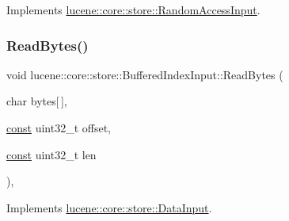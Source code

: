 Implements \mbox{\hyperlink{classlucene_1_1core_1_1store_1_1RandomAccessInput_a3fede3f69a074b11632ad0d07c7bf19f}{lucene\+::core\+::store\+::\+Random\+Access\+Input}}.

\mbox{\label{classlucene_1_1core_1_1store_1_1BufferedIndexInput_ac762d844af38d0b8835f66af3ba46c4c}} 
\subsubsection{\texorpdfstring{Read\+Bytes()}{ReadBytes()}\hspace{0.1cm}{\footnotesize\ttfamily [1/2]}}
{\footnotesize\ttfamily void lucene\+::core\+::store\+::\+Buffered\+Index\+Input\+::\+Read\+Bytes (\begin{DoxyParamCaption}\item[{char}]{bytes\mbox{[}$\,$\mbox{]},  }\item[{\mbox{\hyperlink{ZlibCrc32_8h_a2c212835823e3c54a8ab6d95c652660e}{const}} uint32\+\_\+t}]{offset,  }\item[{\mbox{\hyperlink{ZlibCrc32_8h_a2c212835823e3c54a8ab6d95c652660e}{const}} uint32\+\_\+t}]{len }\end{DoxyParamCaption})\hspace{0.3cm}{\ttfamily [inline]}, {\ttfamily [virtual]}}



Implements \mbox{\hyperlink{classlucene_1_1core_1_1store_1_1DataInput_aa5f24102b9b50a190bcb7a8edb82ea2d}{lucene\+::core\+::store\+::\+Data\+Input}}.

\mbox{\label{classlucene_1_1core_1_1store_1_1BufferedIndexInput_a7f2044785a89abeba70777d0489f8d4f}} 
